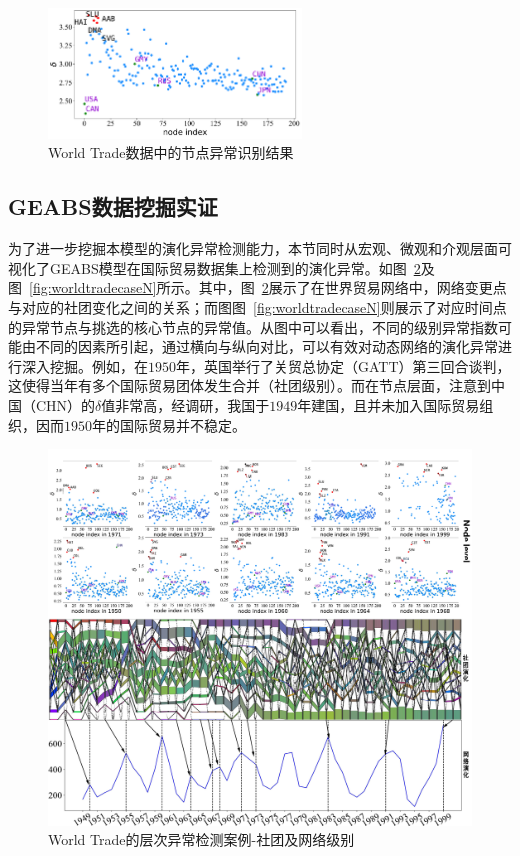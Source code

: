 \begin{figure}
	\centering
	\includegraphics[width=0.6\textwidth]{figures/chap05/worldtradenode-adjusted.pdf}
	\caption{World Trade数据中的节点异常识别结果}
	\label{fig:worldtradenode}
\end{figure}



\subsection{GEABS数据挖掘实证}

为了进一步挖掘本模型的演化异常检测能力，本节同时从宏观、微观和介观层面可视化了GEABS模型在国际贸易数据集上检测到的演化异常。如图~\ref{fig:worldtradecaseCN}及图~\ref{fig:worldtradecaseN}所示。其中，图~\ref{fig:worldtradecaseCN}展示了在世界贸易网络中，网络变更点与对应的社团变化之间的关系；而图图~\ref{fig:worldtradecaseN}则展示了对应时间点的异常节点与挑选的核心节点的异常值。从图中可以看出，不同的级别异常指数可能由不同的因素所引起，通过横向与纵向对比，可以有效对动态网络的演化异常进行深入挖掘。例如，在$1950$年，英国举行了关贸总协定（GATT）第三回合谈判，这使得当年有多个国际贸易团体发生合并（社团级别）。而在节点层面，注意到中国（CHN）的$\delta$值非常高，经调研，我国于$1949$年建国，且并未加入国际贸易组织，因而$1950$年的国际贸易并不稳定。

\begin{figure}
	\centering
	\includegraphics[width=\textwidth]{figures/chap05/worldtrade-CNlevel.pdf}
	\caption{World Trade的层次异常检测案例-社团及网络级别}
	\label{fig:worldtradecaseCN}
\end{figure}

